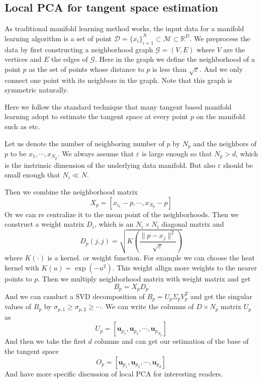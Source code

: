 \documentclass{article}
\begin{document}
\subsection{Local PCA for tangent space estimation}
As traditional manifold learning method works, the input data for a manifold learning algorithm is a set of point $\mathcal{D}=\{x_i\}_{i=1}^N \subset \mathcal{M} \subset \mathbb{R}^D$. We preprocess the data by first constructing a neighborhood graph $\mathcal{G}=(V,E)$ where $V$ are the vertices and $E$ the edges of $\mathcal{G}$. Here in the graph we define the neighborhood of a point $p$ as the set of points whose distance to $p$ is less than $\sqrt{\varepsilon}$. And we only connect one point with its neighbors in the graph. Note that this graph is symmetric naturally.
\par
Here we follow the standard technique that many tangent based manifold learning adopt to estimate the tangent space at every point $p$ on the manifold such as \cite{VDM} \cite{ltsa} etc. 
\par
Let us denote the number of neighboring number of $p$ by $N_p$ and the neighbors of $p$ to be $x_1,\cdots,x_{N_p}$. We always assume that $\varepsilon$ is large enough so that $N_p>d$, which is the instrinsic dimension of the underlying data manifold. But also $\varepsilon$ should be small enough that $N_i\ll N$. 
\par
Then we combine the neighborhood matrix
\begin{equation}
	X_p = [x_{i_1}-p,\cdots,x_{N_p}-p]
\end{equation}
Or we can re centralize it to the mean point of the neighborhoods. Then we construct a weight matrix $D_i$, which is an $N_i\times N_i$ diagonal matrix and
\begin{equation}
	D_p(j,j)=\sqrt{K\left(\frac{\parallel p-x_j\parallel ^2}{\sqrt{\varepsilon}}\right)}
\end{equation}
where $K(\cdot)$ is a kernel. or weight function. For example we can choose the heat kernel with $K(u)=\exp(-u^2)$. This weight allign more weights to the nearer points to $p$. Then we multiply neighborhood matrix with weight matrix and get
\begin{equation}
	B_p=X_pD_p
\end{equation}
And we can canduct a SVD decomposition of $B_p=U_p\Sigma_pV_p^T$ and get the singular values of $B_p$ by $\sigma_{p,1}\geq\sigma_{p,2}\geq\cdots$. We can write the columns of $D \times N_p$ matrix $U_p$ as
\begin{equation}
	U_p=[\boldsymbol{u}_{p_1},\boldsymbol{u}_{p_2},\cdots,\boldsymbol{u}_{p_{N_p}}]
\end{equation}
And then we take the first $d$ columns and can get our estimation of the base of the tangent space
\begin{equation}
	O_p=[\boldsymbol{u}_{p_1},\boldsymbol{u}_{p_2},\cdots,\boldsymbol{u}_{p_{d}}]
\end{equation}
And \cite{VDM} have more specific discussion of local PCA for interesting readers.
\end{document}
